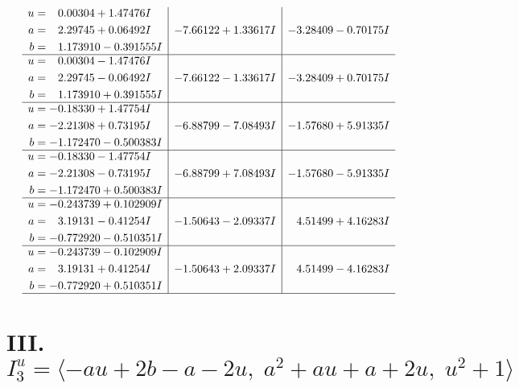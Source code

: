 \documentclass[1p]{elsarticle_modified}
\theoremstyle{definition}
\begin{document}
$$\begin{array}{c|c|c}
\begin{aligned}
u &= \phantom{-}0.00304 + 1.47476 I \\
a &= \phantom{-}2.29745 + 0.06492 I \\
b &= \phantom{-}1.173910 - 0.391555 I\end{aligned}
 & -7.66122 + 1.33617 I & -3.28409 - 0.70175 I \\ \hline\begin{aligned}
u &= \phantom{-}0.00304 - 1.47476 I \\
a &= \phantom{-}2.29745 - 0.06492 I \\
b &= \phantom{-}1.173910 + 0.391555 I\end{aligned}
 & -7.66122 - 1.33617 I & -3.28409 + 0.70175 I \\ \hline\begin{aligned}
u &= -0.18330 + 1.47754 I \\
a &= -2.21308 + 0.73195 I \\
b &= -1.172470 - 0.500383 I\end{aligned}
 & -6.88799 - 7.08493 I & -1.57680 + 5.91335 I \\ \hline\begin{aligned}
u &= -0.18330 - 1.47754 I \\
a &= -2.21308 - 0.73195 I \\
b &= -1.172470 + 0.500383 I\end{aligned}
 & -6.88799 + 7.08493 I & -1.57680 - 5.91335 I \\ \hline\begin{aligned}
u &= -0.243739 + 0.102909 I \\
a &= \phantom{-}3.19131 - 0.41254 I \\
b &= -0.772920 - 0.510351 I\end{aligned}
 & -1.50643 - 2.09337 I & \phantom{-}4.51499 + 4.16283 I \\ \hline\begin{aligned}
u &= -0.243739 - 0.102909 I \\
a &= \phantom{-}3.19131 + 0.41254 I \\
b &= -0.772920 + 0.510351 I\end{aligned}
 & -1.50643 + 2.09337 I & \phantom{-}4.51499 - 4.16283 I\\
 \hline 
 \end{array}$$\newpage\newpage\renewcommand{\arraystretch}{1}
\centering \section*{III. $I^u_{3}= \langle - a u+2 b- a-2 u,\;a^2+a u+a+2 u,\;u^2+1 \rangle$}
\end{document}
